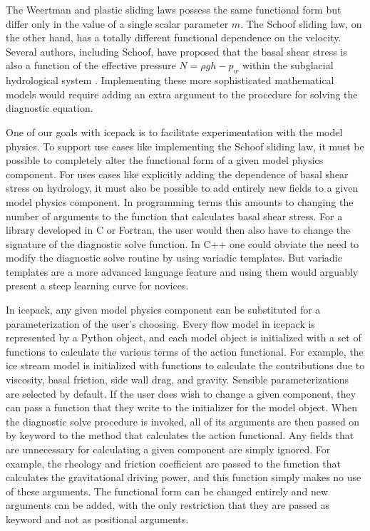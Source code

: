 \documentclass{article}
\theoremstyle{definition}
\theoremstyle{plain}
\begin{document}
The Weertman and plastic sliding laws possess the same functional form but differ only in the value of a single scalar parameter $m$.
The Schoof sliding law, on the other hand, has a totally different functional dependence on the velocity.
Several authors, including Schoof, have proposed that the basal shear stress is also a function of the effective pressure $N = \rho gh - p_w$ within the subglacial hydrological system \citep{budd1979empirical, schoof2005effect}.
Implementing these more sophisticated mathematical models would require adding an extra argument to the procedure for solving the diagnostic equation.

One of our goals with icepack is to facilitate experimentation with the model physics.
To support use cases like implementing the Schoof sliding law, it must be possible to completely alter the functional form of a given model physics component.
For uses cases like explicitly adding the dependence of basal shear stress on hydrology, it must also be possible to add entirely new fields to a given model physics component.
In programming terms this amounts to changing the number of arguments to the function that calculates basal shear stress.
For a library developed in C or Fortran, the user would then also have to change the signature of the diagnostic solve function.
In C++ one could obviate the need to modify the diagnostic solve routine by using variadic templates.
But variadic templates are a more advanced language feature and using them would arguably present a steep learning curve for novices.

In icepack, any given model physics component can be substituted for a parameterization of the user's choosing.
Every flow model in icepack is represented by a Python object, and each model object is initialized with a set of functions to calculate the various terms of the action functional.
For example, the ice stream model is initialized with functions to calculate the contributions due to viscosity, basal friction, side wall drag, and gravity.
Sensible parameterizations are selected by default.
If the user does wish to change a given component, they can pass a function that they write to the initializer for the model object.
When the diagnostic solve procedure is invoked, all of its arguments are then passed on by keyword to the method that calculates the action functional.
Any fields that are unnecessary for calculating a given component are simply ignored.
For example, the rheology and friction coefficient are passed to the function that calculates the gravitational driving power, and this function simply makes no use of these arguments.
The functional form can be changed entirely and new arguments can be added, with the only restriction that they are passed as keyword and not as positional arguments.
\end{document}

